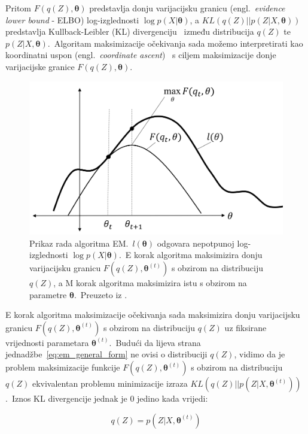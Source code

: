 \documentclass[diplomskirad]{fer}
\begin{document}
Pritom $F(q(Z), \bm{\theta})$ predstavlja donju varijacijsku granicu (engl.\ \textit{evidence lower bound} - ELBO) log-izglednosti $\log p(X | \bm{\theta})$, a $KL(q(Z) || p(Z | X, \bm{\theta}))$ predstavlja Kullback-Leibler (KL) divergenciju~\cite{perez2008kullback} između distribucija $q(Z)$ te $p(Z | X, \bm{\theta})$.\
Algoritam maksimizacije očekivanja sada možemo interpretirati kao koordinatni uspon (engl.\ \textit{coordinate ascent})~\cite{neal1998view} s ciljem maksimizacije donje varijacijske granice $F(q(Z), \bm{\theta})$.\ 

\begin{figure}[h]
  \centering
  \includegraphics[scale=0.7]{./Slike/em_algoritam.png}
  \caption{Prikaz rada algoritma EM.\ $l(\bm{\theta})$ odgovara nepotpunoj log-izglednosti $\log p(X | \bm{\theta})$.\ E korak algoritma maksimizira donju varijacijsku granicu $F(q(Z), \bm{\theta}^{(t)})$ s obzirom na distribuciju $q(Z)$, a M korak algoritma maksimizira istu s obzirom na parametre $\bm{\theta}$.\ Preuzeto iz \cite{bernsteinEMblog}.}
  \label{fig:em_alg}
\end{figure}

E korak algoritma maksimizacije očekivanja sada maksimizira donju varijacijsku granicu $F(q(Z), \bm{\theta}^{(t)})$ s obzirom na distribuciju $q(Z)$ uz fiksirane vrijednosti parametara $\bm{\theta}^{(t)}$.\ 
Budući da lijeva strana jednadžbe~\ref{eq:em_general_form} ne ovisi o distribuciji $q(Z)$, vidimo da je problem maksimizacije funkcije $F(q(Z), \bm{\theta}^{(t)})$ s obzirom na distribuciju $q(Z)$ ekvivalentan problemu minimizacije izraza $KL(q(Z) || p(Z | X, \bm{\theta}^{(t)}))$.\ 
Iznos KL divergencije jednak je $0$ jedino kada vrijedi:

\begin{equation}
  q(Z) = p(Z | X, \bm{\theta}^{(t)})
  \label{eq:em_e_step_q}
\end{equation}
\end{document}
